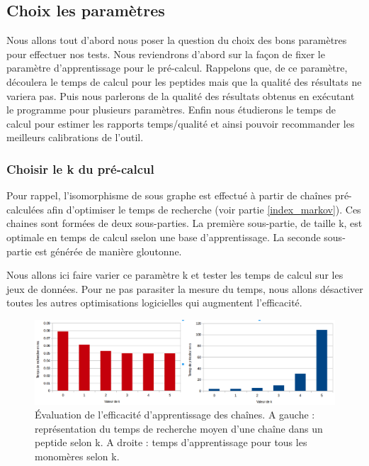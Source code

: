 \subsection{Choix les paramètres}

\label{parameters_choice}

Nous allons tout d'abord nous poser la question du choix des bons paramètres pour effectuer nos tests.
Nous reviendrons d'abord sur la façon de fixer le paramètre d'apprentissage pour le pré-calcul.
Rappelons que, de ce paramètre, découlera le temps de calcul pour les peptides mais que la qualité des résultats ne variera pas.
Puis nous parlerons de la qualité des résultats obtenus en exécutant le programme pour plusieurs paramètres.
Enfin nous étudierons le temps de calcul pour estimer les rapports temps/qualité et ainsi pouvoir recommander les meilleurs calibrations de l'outil.

\subsubsection{Choisir le k du pré-calcul}

Pour rappel, l'isomorphisme de sous graphe est effectué à partir de chaînes pré-calculées afin d'optimiser le temps de recherche (voir partie \ref{index_markov}).
Ces chaines sont formées de deux sous-parties.
La première sous-partie, de taille k, est optimale en temps de calcul sselon une base d'apprentissage.
La seconde sous-partie est générée de manière gloutonne.

Nous allons ici faire varier ce paramètre k et tester les temps de calcul sur les jeux de données.
Pour ne pas parasiter la mesure du temps, nous allons désactiver toutes les autres optimisations logicielles qui augmentent l'efficacité.

\begin{figure}[!ht]
  \begin{center}
    \includegraphics[width=450px]{Figures/s2m/results/k.png}
    \caption{\label{k_graph}Évaluation de l'efficacité d'apprentissage des chaînes.
    A gauche : représentation du temps de recherche moyen d'une chaîne dans un peptide selon k.
    A droite : temps d'apprentissage pour tous les monomères selon k.}
  \end{center}
\end{figure}

